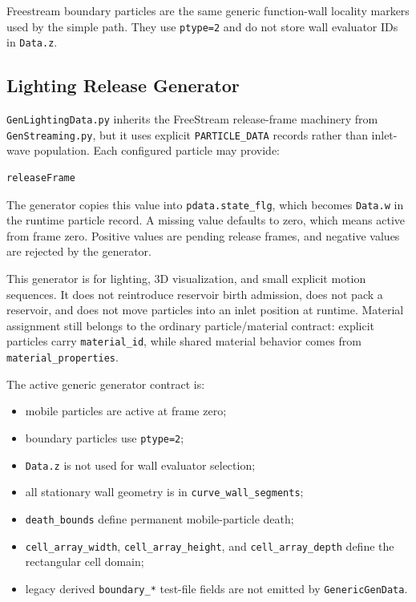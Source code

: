 Freestream boundary particles are the same generic function-wall locality
markers used by the simple path.  They use \texttt{ptype=2} and do not
store wall evaluator IDs in \texttt{Data.z}.

\subsection{Lighting Release Generator}

\texttt{GenLightingData.py} inherits the FreeStream release-frame machinery
from \texttt{GenStreaming.py}, but it uses explicit
\texttt{PARTICLE\_DATA} records rather than inlet-wave population.  Each
configured particle may provide:
\begin{verbatim}
releaseFrame
\end{verbatim}
The generator copies this value into \texttt{pdata.state\_flg}, which becomes
\texttt{Data.w} in the runtime particle record.  A missing value defaults to
zero, which means active from frame zero.  Positive values are pending release
frames, and negative values are rejected by the generator.

This generator is for lighting, 3D visualization, and small explicit motion
sequences.  It does not reintroduce reservoir birth admission, does not pack a
reservoir, and does not move particles into an inlet position at runtime.
Material assignment still belongs to the ordinary particle/material contract:
explicit particles carry \texttt{material\_id}, while shared material behavior
comes from \texttt{material\_properties}.

The active generic generator contract is:
\begin{itemize}
    \item mobile particles are active at frame zero;
    \item boundary particles use \texttt{ptype=2};
    \item \texttt{Data.z} is not used for wall evaluator selection;
    \item all stationary wall geometry is in
          \texttt{curve\_wall\_segments};
    \item \texttt{death\_bounds} define permanent mobile-particle death;
    \item \texttt{cell\_array\_width},
          \texttt{cell\_array\_height}, and
          \texttt{cell\_array\_depth} define the rectangular cell domain;
    \item legacy derived \texttt{boundary\_*} test-file fields are not
          emitted by \texttt{GenericGenData}.
\end{itemize}

